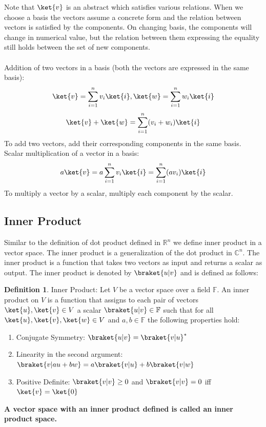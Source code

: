 \documentclass[12pt, oneside]{book}
\theoremstyle{definition}
\newtheorem{definition}{Definition}[section]
\theoremstyle{definition}
\theoremstyle{remark}
\begin{document}
Note that $\ket{v}$ is an abstract which satisfies various relations. When we choose a basis the vectors assume a concrete form and the relation between 
vectors is satisfied by the components. On changing basis, the components will change in numerical value, but the relation between them expressing the equality
still holds between the set of new components. \\
\\
Addition of two vectors in a basis (both the vectors are expressed in the same basis): 
\[
    \ket{v}=\sum_{i=1}^{n}v_i\ket{i}, \ket{w}=\sum_{i=1}^{n}w_i\ket{i}
\]
\[
    \ket{v}+\ket{w}=\sum_{i=1}^{n}(v_i+w_i)\ket{i}
\]
To add two vectors, add their corresponding components in the same basis. \\
Scalar multiplication of a vector in a basis:
\[
    a\ket{v}=a\sum_{i=1}^{n}v_i\ket{i}=\sum_{i=1}^{n}(av_i)\ket{i}
\]
To multiply a vector by a scalar, multiply each component by the scalar. \\

\subsection{Inner Product}
Similar to the definition of dot product defined in $\mathbb{R}^n$ we define inner product in a vector space. The inner product is a generalization of the dot product in $\mathbb{C}^n$.
The inner product is a function that takes two vectors as input and returns a scalar as output. The inner product is denoted by $\braket{u|v}$ and is defined as follows:
\begin{definition}
    Inner Product: Let $V$ be a vector space over a field $\mathbb{F}$. An inner product on $V$ is a function that assigns to each pair of vectors $\ket{u},\ket{v}\in V$ a scalar $\braket{u|v}\in\mathbb{F}$ such that for all $\ket{u},\ket{v},\ket{w}\in V$ and $a,b\in\mathbb{F}$ the following properties hold:
    \begin{enumerate}
        \item Conjugate Symmetry: $\braket{u|v}={\braket{v|u}}^*$
        \item Linearity in the second argument: $\braket{v|au+bw}=a\braket{v|u}+b\braket{v|w}$
        \item Positive Definite: $\braket{v|v}\geq 0$ and $\braket{v|v}=0$ iff $\ket{v}=\ket{0}$
    \end{enumerate}
\end{definition}

\textbf{A vector space with an inner product defined is called an inner product space.}
\end{document}
